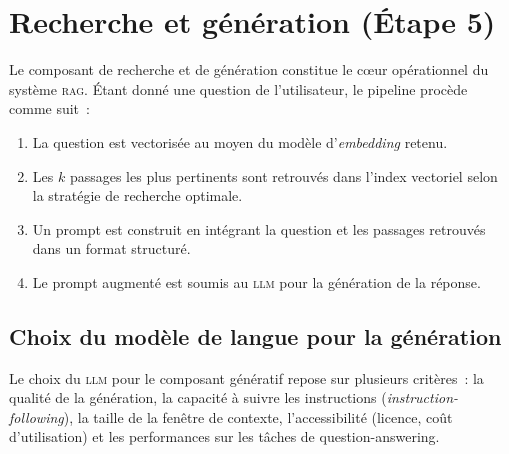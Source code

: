 \documentclass[12pt,a4paper,oneside]{report}
\newcommand{\rag}{\textsc{rag}}
\newcommand{\llm}{\textsc{llm}}
\begin{document}
\section{Recherche et génération (Étape 5)}
\label{sec:retrieval_generation}

Le composant de recherche et de génération constitue le c\oe{}ur opérationnel du système \rag{}. Étant donné une question de l'utilisateur, le pipeline procède comme suit~:

\begin{enumerate}[nosep]
  \item La question est vectorisée au moyen du modèle d'\textit{embedding} retenu.
  \item Les $k$ passages les plus pertinents sont retrouvés dans l'index vectoriel selon la stratégie de recherche optimale.
  \item Un prompt est construit en intégrant la question et les passages retrouvés dans un format structuré.
  \item Le prompt augmenté est soumis au \llm{} pour la génération de la réponse.
\end{enumerate}

\subsection{Choix du modèle de langue pour la génération}

Le choix du \llm{} pour le composant génératif repose sur plusieurs critères~: la qualité de la génération, la capacité à suivre les instructions (\textit{instruction-following}), la taille de la fenêtre de contexte, l'accessibilité (licence, coût d'utilisation) et les performances sur les tâches de question-answering.
\end{document}
